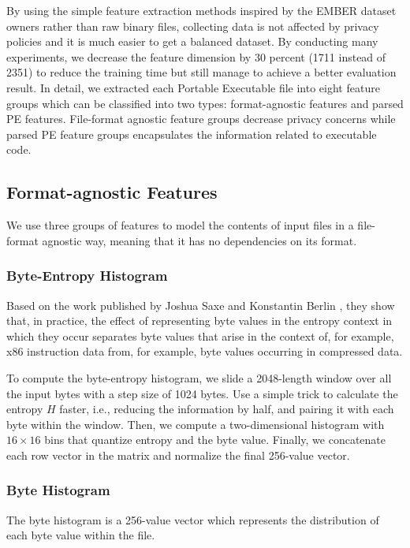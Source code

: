 By using the simple feature extraction methods inspired by the EMBER dataset owners rather than raw binary files, collecting data is not affected by privacy policies and it is much easier to get a balanced dataset.
By conducting many experiments, we decrease the feature dimension by 30 percent (1711 instead of 2351) to reduce the training time but still manage to achieve a better evaluation result.
In detail, we extracted each Portable Executable file into eight feature groups which can be classified into two types: format-agnostic features and parsed PE features.
File-format agnostic feature groups decrease privacy concerns while parsed PE feature groups encapsulates the information related to executable code.

\subsection{Format-agnostic Features}

We use three groups of features to model the contents of input files in a file-format agnostic way, meaning that it has no dependencies on its format.

\subsubsection{Byte-Entropy Histogram}

Based on the work published by Joshua Saxe and Konstantin Berlin \cite{saxe2015deep}, they show that, in practice, the effect of representing byte values in the entropy context in which they occur separates byte values that arise in the context of, for example, x86 instruction data from, for example, byte values occurring in compressed data.

To compute the byte-entropy histogram, we slide a 2048-length window over all the input bytes with a step size of 1024 bytes. Use a simple trick to calculate the entropy $H$ faster, i.e., reducing the information by half, and pairing it with each byte within the window. Then, we compute a two-dimensional histogram with $16 \times 16$ bins that quantize entropy and the byte value. Finally, we concatenate each row vector in the matrix and normalize the final 256-value vector.

\subsubsection{Byte Histogram}

The byte histogram is a 256-value vector which represents the distribution of each byte value within the file.


